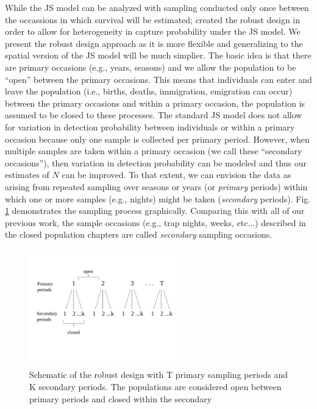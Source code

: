 While the JS model can be analyzed with sampling conducted only once between the occassions
in which survival will be estimated; 
\citet{pollock:1982} created the robust design in order to allow for heterogeneity in capture probability
under the JS model.  We present the robust design approach as it is more flexible and generalizing
to the spatial version of the JS model will be much simplier.
The basic idea is that there are primary occasions (e.g., years, seasons) and we
allow the population to be ``open'' between the primary occasions.  This means that individuals can enter
and leave the population (i.e., births, deaths, immigration,
emigration can occur) between the primary occasions and within a primary occasion, 
the population is assumed to be
closed to these processes.
The standard JS model 
does not allow for variation in detection probability between individuals or within
a primary occasion because only one sample is collected per primary
period.
However, when multiple samples are taken within a primary
occasion (we call these ``secondary occasions''), then variation in detection probability can be modeled and thus
our estimates of $N$ can be improved.  To
that extent, we can envision the data as arising from repeated
sampling over seasons or years (or {\it primary} periods) within which
one or more samples (e.g., nights) might be taken ({\it secondary}
periods). Fig. \ref{open.figs.robustdesign} demonstrates the sampling process graphically.
Comparing this with all of our previous work, the sample
occasions %
(e.g., trap nights, weeks, etc$\dots$) described in the closed
population chapters are 
called {\it secondary} sampling occasions. 



\begin{figure}[h]
\centering
\includegraphics[height=2in,width=2.5in]{Ch16-Open/figs/RobustDesign.pdf}
\caption{Schematic of the robust design with T primary sampling periods and K secondary periods. The populations
are considered open between primary periods and closed within the secondary}
\label{open.figs.robustdesign}
\end{figure}

